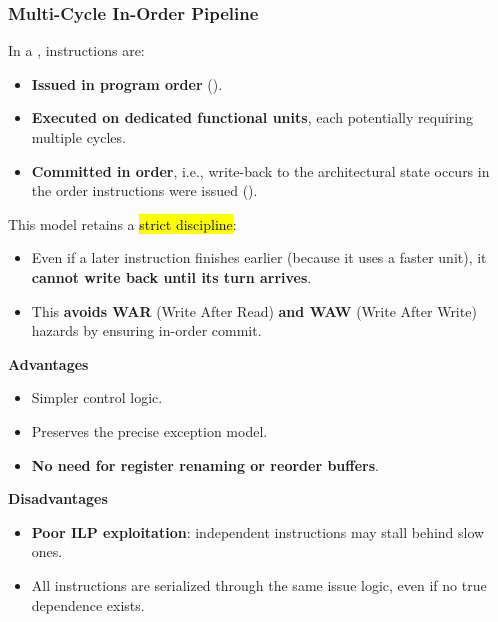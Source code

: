 \subsubsection{Multi-Cycle In-Order Pipeline}

In a , instructions are:
\begin{itemize}
    \item \textbf{Issued in program order} (). 
    \item \textbf{Executed on dedicated functional units}, each potentially requiring multiple cycles.  
    \item \textbf{Committed in order}, i.e., write-back to the architectural state occurs in the order instructions were issued ().
\end{itemize}
This model retains a \hl{strict discipline}:
\begin{itemize}
    \item Even if a later instruction finishes earlier (because it uses a faster unit), it \textbf{cannot write back until its turn arrives}.
    \item This \textbf{avoids WAR} (Write After Read) \textbf{and WAW} (Write After Write) hazards by ensuring in-order commit.
\end{itemize}

\highspace
\begin{flushleft}
    \textcolor{Green3}{ \textbf{Advantages}}
\end{flushleft}
\begin{itemize}[label=\textcolor{Green3}{}]
    \item Simpler control logic.
    \item Preserves the precise exception model.
    \item \textbf{No need for register renaming or reorder buffers}.
\end{itemize}

\highspace
\begin{flushleft}
    \textcolor{Red2}{ \textbf{Disadvantages}}
\end{flushleft}
\begin{itemize}[label=\textcolor{Red2}{}]
    \item \textbf{Poor ILP exploitation}: independent instructions may stall behind slow ones.
    \item All instructions are serialized through the same issue logic, even if no true dependence exists.
\end{itemize}

